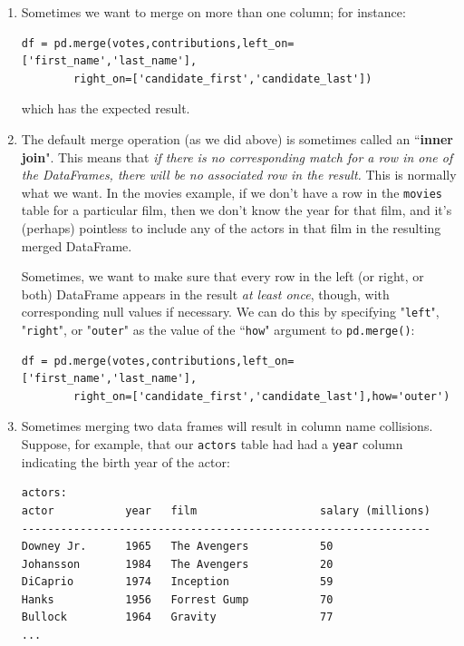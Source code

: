 \documentclass[12pt]{article}
\begin{document}
\begin{enumerate}
\itemsep.1em
\item Sometimes we want to merge on more than one column; for instance:

\begin{Verbatim}[fontsize=small,samepage=true,frame=none]
df = pd.merge(votes,contributions,left_on=['first_name','last_name'],
        right_on=['candidate_first','candidate_last'])
\end{Verbatim}
which has the expected result.

\vspace{.2in}
\item The default merge operation (as we did above) is sometimes called an
``\textbf{inner join}". This means that \textit{if there is no corresponding
match for a row in one of the DataFrames, there will be no associated row in
the result.} This is normally what we want. In the movies example, if we don't
have a row in the \texttt{movies} table for a particular film, then we don't
know the year for that film, and it's (perhaps) pointless to include any of
the actors in that film in the resulting merged DataFrame.

Sometimes, we want to make sure that every row in the left (or right, or
both) DataFrame appears in the result \textit{at least once}, though, with
corresponding null values if necessary. We can do this by specifying
"\texttt{left}", "\texttt{right}", or "\texttt{outer}" as the value of the
``\texttt{how}" argument to \texttt{pd.merge()}:

\begin{Verbatim}[fontsize=small,samepage=true,frame=none]
df = pd.merge(votes,contributions,left_on=['first_name','last_name'],
        right_on=['candidate_first','candidate_last'],how='outer')
\end{Verbatim}

\vspace{.2in}
\item Sometimes merging two data frames will result in column name
collisions. Suppose, for example, that our \texttt{actors} table had had a
\texttt{year} column indicating the birth year of the actor:

\begin{Verbatim}[fontsize=small,samepage=true,frame=none]
                        actors:
actor           year   film                   salary (millions)
---------------------------------------------------------------
Downey Jr.      1965   The Avengers           50
Johansson       1984   The Avengers           20
DiCaprio        1974   Inception              59
Hanks           1956   Forrest Gump           70
Bullock         1964   Gravity                77
...
\end{Verbatim}


\end{enumerate}
\end{document}
